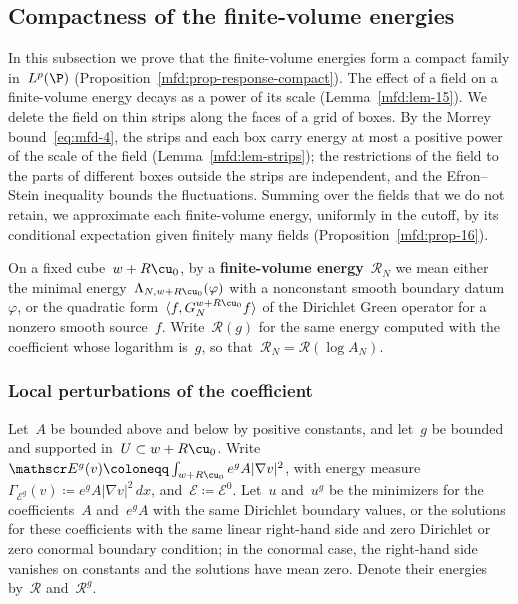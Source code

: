 \documentclass[11pt]{amsart}
\begin{document}
\subsection{Compactness of the finite-volume energies}
\label{mfd:sec-resampling}

In this subsection we prove that the finite-volume energies form a compact family in~$L^p(\P)$ (Proposition~\ref{mfd:prop-response-compact}). The effect of a field on a finite-volume energy decays as a power of its scale (Lemma~\ref{mfd:lem-15}). We delete the field on thin strips along the faces of a grid of boxes. By the Morrey bound~\eqref{eq:mfd-4}, the strips and each box carry energy at most a positive power of the scale of the field (Lemma~\ref{mfd:lem-strips}); the restrictions of the field to the parts of different boxes outside the strips are independent, and the Efron--Stein inequality bounds the fluctuations. Summing over the fields that we do not retain, we approximate each finite-volume energy, uniformly in the cutoff, by its conditional expectation given finitely many fields (Proposition~\ref{mfd:prop-16}).

\smallskip

On a fixed cube~$w+R\cu_0$, by a \textbf{finite-volume energy}~$\mathcal R_N$ we mean either the minimal energy~$\Lambda_{N,w+R\cu_0}(\varphi)$ with a nonconstant smooth boundary datum~$\varphi$, or the quadratic form~$\langle f,G_N^{w+R\cu_0}f\rangle$ of the Dirichlet Green operator for a nonzero smooth source~$f$. Write~$\mathcal R(g)$ for the same energy computed with the coefficient whose logarithm is~$g$, so that~$\mathcal R_N=\mathcal R(\log A_N)$.

\subsubsection{Local perturbations of the coefficient}

Let~$A$ be bounded above and below by positive constants, and let~$g$ be bounded and supported in~$U\subset w+R\cu_0$. Write~$\mathscr E^g(v)\coloneqq\int_{w+R\cu_0}e^gA|\nabla v|^2$, with energy measure~$\Gamma_{\mathscr E^g}(v)\coloneqq e^gA|\nabla v|^2\,dx$, and~$\mathscr E\coloneqq \mathscr E^0$. Let~$u$ and~$u^g$ be the minimizers for the coefficients~$A$ and~$e^gA$ with the same Dirichlet boundary values, or the solutions for these coefficients with the same linear right-hand side and zero Dirichlet or zero conormal boundary condition; in the conormal case, the right-hand side vanishes on constants and the solutions have mean zero. Denote their energies by~$\mathcal R$ and~$\mathcal R^g$.
\end{document}

